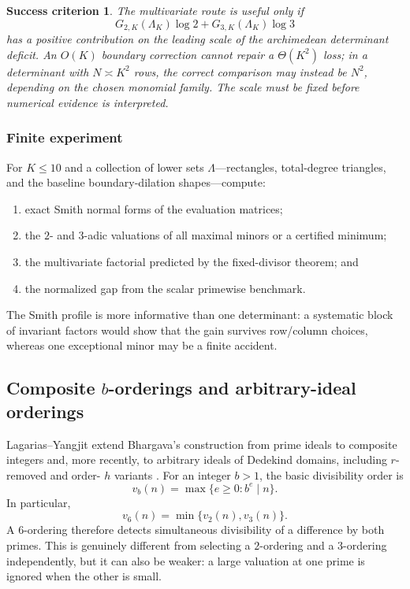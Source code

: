 \documentclass[10pt,letterpaper]{article}
\newtheorem{criterion}{Success criterion}[section]
\begin{document}
\begin{criterion}
The multivariate route is useful only if
\[
  G_{2,K}(\Lambda_K)\log2+G_{3,K}(\Lambda_K)\log3
\]
has a positive contribution on the leading scale of the archimedean determinant deficit.
An \(O(K)\) boundary correction cannot repair a \(\Theta(K^2)\) loss; in a determinant with
\(N\asymp K^2\) rows, the correct comparison may instead be \(N^2\), depending on the chosen
monomial family.  The scale must be fixed before numerical evidence is interpreted.
\end{criterion}

\subsubsection{Finite experiment}

For \(K\leq 10\) and a collection of lower sets \(\Lambda\)---rectangles, total-degree
triangles, and the baseline boundary-dilation shapes---compute:

\begin{enumerate}
\item exact Smith normal forms of the evaluation matrices;
\item the \(2\)- and \(3\)-adic valuations of all maximal minors or a certified minimum;
\item the multivariate factorial predicted by the fixed-divisor theorem; and
\item the normalized gap from the scalar primewise benchmark.
\end{enumerate}

The Smith profile is more informative than one determinant: a systematic block of invariant
factors would show that the gain survives row/column choices, whereas one exceptional minor
may be a finite accident.

\subsection{Composite \texorpdfstring{\(b\)}{b}-orderings and arbitrary-ideal orderings}

Lagarias--Yangjit extend Bhargava's construction from prime ideals to composite integers and,
more recently, to arbitrary ideals of Dedekind domains, including \(r\)-removed and order-
\(h\) variants \cite{LagariasYangjit2024,LagariasYangjit2025}.  For an integer \(b>1\), the
basic divisibility order is
\[
  v_b(n)=\max\{e\geq0:b^e\mid n\}.
\]
In particular,
\[
  v_6(n)=\min\{v_2(n),v_3(n)\}.
\]
A \(6\)-ordering therefore detects simultaneous divisibility of a difference by both primes.
This is genuinely different from selecting a \(2\)-ordering and a \(3\)-ordering
independently, but it can also be weaker: a large valuation at one prime is ignored when the
other is small.
\end{document}
